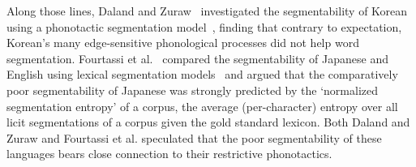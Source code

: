 \documentclass[11pt]{article}
\begin{document}

Along those lines, Daland and Zuraw~ investigated the segmentability of Korean using a phonotactic segmentation model~\cite{Daland11a}, finding that contrary to expectation, Korean's many edge-sensitive phonological processes did not help word segmentation. %
Fourtassi et al.~ compared the segmentability of Japanese and English using lexical segmentation models~\cite{Goldwater09a,Johnson09a} and argued that the comparatively poor segmentability of Japanese was strongly predicted by the `normalized segmentation entropy' of a corpus, the average (per-character) entropy over all licit segmentations of a corpus given the gold standard lexicon. Both Daland and Zuraw and Fourtassi et al. speculated that the poor segmentability of these languages bears close connection to their restrictive phonotactics.
\end{document}
